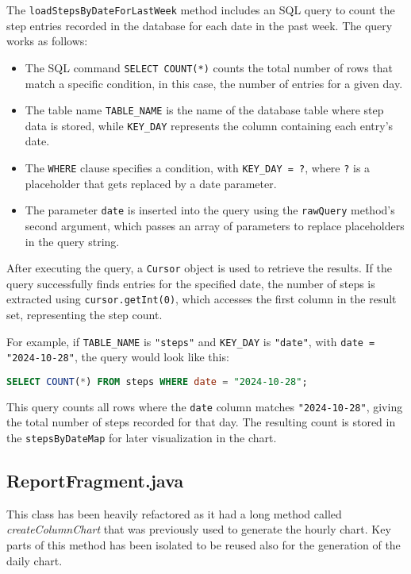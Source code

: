         The \texttt{loadStepsByDateForLastWeek} method includes an SQL query to count the step entries recorded in the database for each date in the past week. The query works as follows:
        
        \begin{itemize}
            \item The SQL command \texttt{SELECT COUNT(*)} counts the total number of rows that match a specific condition, in this case, the number of entries for a given day.
            \item The table name \texttt{TABLE\_NAME} is the name of the database table where step data is stored, while \texttt{KEY\_DAY} represents the column containing each entry's date.
            \item The \texttt{WHERE} clause specifies a condition, with \texttt{KEY\_DAY = ?}, where \texttt{?} is a placeholder that gets replaced by a date parameter.
            \item The parameter \texttt{date} is inserted into the query using the \texttt{rawQuery} method's second argument, which passes an array of parameters to replace placeholders in the query string.
        \end{itemize}
        
        After executing the query, a \texttt{Cursor} object is used to retrieve the results. If the query successfully finds entries for the specified date, the number of steps is extracted using \texttt{cursor.getInt(0)}, which accesses the first column in the result set, representing the step count.
        
        For example, if \texttt{TABLE\_NAME} is \texttt{"steps"} and \texttt{KEY\_DAY} is \texttt{"date"}, with \texttt{date = "2024-10-28"}, the query would look like this:
        
        \begin{lstlisting}[language=SQL,label={lst:query}]
            SELECT COUNT(*) FROM steps WHERE date = "2024-10-28";
        \end{lstlisting}
        
        This query counts all rows where the \texttt{date} column matches \texttt{"2024-10-28"}, giving the total number of steps recorded for that day. The resulting count is stored in the \texttt{stepsByDateMap} for later visualization in the chart.
        
\subsection{ReportFragment.java}
    This class has been heavily refactored as it had a long method called \textit{createColumnChart} that was previously used to generate the hourly chart.
    Key parts of this method has been isolated to be reused also for the generation of the daily chart.

